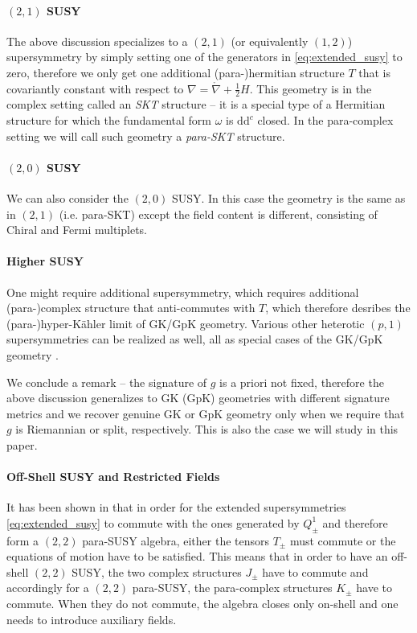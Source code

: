 \documentclass{article}
\newcommand{\lc}{\mathring{\n}}
\newcommand{\n}{\nabla}
\newcommand{\rd}{\mathrm{d}}
\theoremstyle{definition}
\theoremstyle{definition}
\theoremstyle{remark}
\begin{document}
\paragraph*{$(2,1)$ SUSY} The above discussion specializes to a $(2,1)$ (or equivalently $(1,2)$) supersymmetry by simply setting one of the generators in \eqref{eq:extended_susy} to zero, therefore we only get one additional (para-)hermitian structure $T$ that is covariantly constant with respect to $\n=\lc+\frac{1}{2}H$. This geometry is in the complex setting called an {\it SKT} structure -- it is a special type of a Hermitian structure for which the fundamental form $\omega$ is $\rd \rd^c$ closed. In the para-complex setting we will call such geometry a {\it para-SKT} structure.

\paragraph*{$(2,0)$ SUSY} We can also consider the $(2,0)$ SUSY. In this case the geometry is the same as in $(2,1)$ (i.e. para-SKT) except the field content is different, consisting of Chiral and Fermi multiplets.

\paragraph*{Higher SUSY}  One might require additional supersymmetry, which requires additional (para-)complex structure that anti-commutes with $T$, which therefore desribes the (para-)hyper-K\"ahler limit of GK/GpK geometry. Various other heterotic $(p,1)$ supersymmetries can be realized as well, all as special cases of the GK/GpK geometry \cite{HullTwistedSUSY}.

We conclude a remark -- the signature of $g$ is a priori not fixed, therefore the above discussion generalizes to GK (GpK) geometries with different signature metrics and we recover genuine GK or GpK geometry only when we require that $g$ is Riemannian or split, respectively. This is also the case we will study in this paper.

\paragraph{Off-Shell SUSY and Restricted Fields}
It has been shown in \cite{Offshell_GK} that in order for the extended supersymmetries \eqref{eq:extended_susy} to commute with the ones generated by $Q^1_\pm$ and therefore form a $(2,2)$ para-SUSY algebra, either the tensors $T_\pm$ must commute or the equations of motion have to be satisfied. This means that in order to have an off-shell $(2,2)$ SUSY, the two complex structures $J_\pm$ have to commute and accordingly for a $(2,2)$ para-SUSY, the para-complex structures $K_\pm$ have to commute. When they do not commute, the algebra closes only on-shell and one needs to introduce auxiliary fields.
\end{document}
